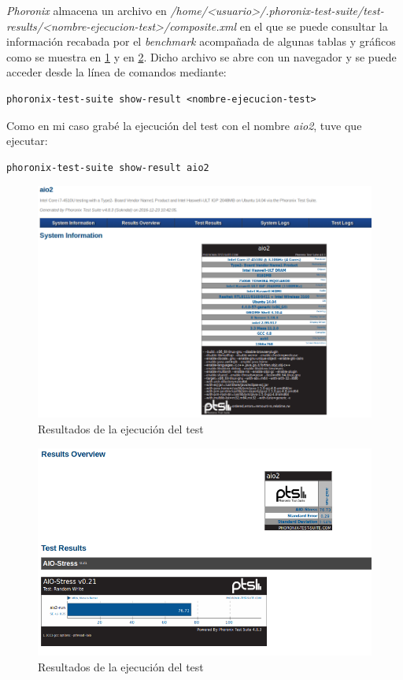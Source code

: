 \textit{Phoronix} almacena un archivo en \textit{/home/<usuario>/.phoronix-test-suite/test-results/<nombre-ejecucion-test>/composite.xml} en el que se puede consultar la información recabada por el \textit{benchmark} acompañada de algunas tablas y gráficos como se muestra en \ref{cuestion1-05} y en \ref{cuestion1-06}. Dicho archivo se abre con un navegador y se puede acceder desde la línea de comandos mediante:

\begin{verbatim}
phoronix-test-suite show-result <nombre-ejecucion-test>
\end{verbatim}

Como en mi caso grabé la ejecución del test con el nombre \textit{aio2}, tuve que ejecutar:

\begin{verbatim}
phoronix-test-suite show-result aio2
\end{verbatim}

\begin{figure}[H]
	\centering
	\includegraphics[scale=0.45]{cuestion1-05.png}
	\caption{Resultados de la ejecución del test} \label{cuestion1-05}
\end{figure}

\begin{figure}[H]
	\centering
	\includegraphics[scale=0.5]{cuestion1-06.png}
	\caption{Resultados de la ejecución del test} \label{cuestion1-06}
\end{figure}

